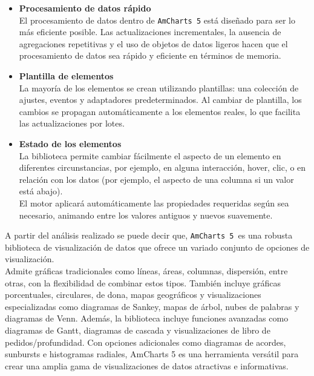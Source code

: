 \begin{itemize}
    \item \textbf{Procesamiento de datos rápido}\\
    El procesamiento de datos dentro de \texttt{AmCharts 5} está diseñado para ser lo más eficiente posible. Las actualizaciones incrementales, la ausencia de agregaciones repetitivas y el uso de objetos de datos ligeros hacen que el procesamiento de datos sea rápido y eficiente en términos de memoria.

    \item \textbf{Plantilla de elementos}\\
    La mayoría de los elementos se crean utilizando plantillas: una colección de ajustes, eventos y adaptadores predeterminados. Al cambiar de plantilla, los cambios se propagan automáticamente a los elementos reales, lo que facilita las actualizaciones por lotes.

    \item \textbf{Estado de los elementos}\\
    La biblioteca permite cambiar fácilmente el aspecto de un elemento en diferentes circunstancias, por ejemplo, en alguna interacción, hover, clic, o en relación con los datos (por ejemplo, el aspecto de una columna si un valor está abajo).\\
    El motor aplicará automáticamente las propiedades requeridas según sea necesario, animando entre los valores antiguos y nuevos suavemente.
\end{itemize}

A partir del análisis realizado se puede decir que, \texttt{AmCharts 5 }es una robusta biblioteca de visualización de datos que ofrece un variado conjunto de opciones de visualización. \\
Admite gráficas tradicionales como líneas, áreas, columnas, dispersión, entre otras, con la flexibilidad de combinar estos tipos. También incluye gráficas porcentuales, circulares, de dona, mapas geográficos y visualizaciones especializadas como diagramas de Sankey, mapas de árbol, nubes de palabras y diagramas de Venn. Además, la biblioteca incluye funciones avanzadas como diagramas de Gantt, diagramas de cascada y visualizaciones de libro de pedidos/profundidad. Con opciones adicionales como diagramas de acordes, sunbursts e histogramas radiales, AmCharts 5 es una herramienta versátil para crear una amplia gama de visualizaciones de datos atractivas e informativas.



